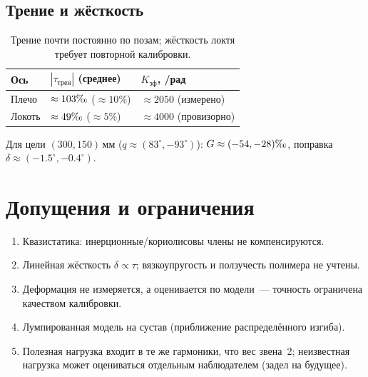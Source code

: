 \documentclass[12pt,a4paper]{article}
\newcommand{\mm}{\,\text{мм}}
\newcommand{\permil}{\text{\textperthousand}}
\begin{document}
\subsection{Трение и жёсткость}
\begin{table}[h]\centering\small
\begin{tabular}{@{}lll@{}}\toprule
Ось & $|\tau_\text{трен}|$ (среднее) & $K_\text{эф}$, \permil{}/рад\\\midrule
Плечо & $\approx103\permil$ ($\approx10\%$) & $\approx2050$ (измерено)\\
Локоть & $\approx49\permil$ ($\approx5\%$) & $\approx4000$ (провизорно)\\\bottomrule
\end{tabular}
\caption{Трение почти постоянно по позам; жёсткость локтя требует повторной
калибровки.}
\end{table}
Для цели $(300,150)\mm$ ($q\approx(83^\circ,-93^\circ)$): $G\approx(-54,-28)\permil$,
поправка $\delta\approx(-1.5^\circ,-0.4^\circ)$.

\section{Допущения и ограничения}
\begin{enumerate}\itemsep2pt
\item Квазистатика: инерционные/кориолисовы члены не компенсируются.
\item Линейная жёсткость $\delta\propto\tau$; вязкоупругость и ползучесть
полимера не учтены.
\item Деформация не измеряется, а оценивается по модели~--- точность ограничена
качеством калибровки.
\item Лумпированная модель на сустав (приближение распределённого изгиба).
\item Полезная нагрузка входит в те же гармоники, что вес звена~2; неизвестная
нагрузка может оцениваться отдельным наблюдателем (задел на будущее).
\end{enumerate}
\end{document}
